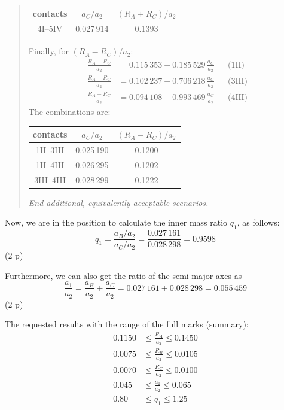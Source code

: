 \begin{description}
\begin{description}
\begin{quote}
\begin{center}
    \begin{tabular}{ccc}
      \hline
      contacts & $a_C/a_2$ & $(R_A + R_C)/a_2$ \\
      \hline
      4I--5IV & 0.027\,914 & 0.1393 \\
      \hline
    \end{tabular}
    \end{center}
    Finally, for $(R_A - R_C)/a_2$:
    \begin{align*}
      \frac{R_A - R_C}{a_2}
        &= 0.115\,353 + 0.185\,529\,\frac{a_C}{a_2}
        && \text{(1II)} \\
      \frac{R_A - R_C}{a_2}
        &= 0.102\,237 + 0.706\,218\,\frac{a_C}{a_2}
        && \text{(3III)} \\
      \frac{R_A - R_C}{a_2}
        &= 0.094\,108 + 0.993\,469\,\frac{a_C}{a_2}
        && \text{(4III)}
    \end{align*}
    The combinations are:
    \begin{center}
    \begin{tabular}{ccc}
      \hline
      contacts & $a_C/a_2$ & $(R_A - R_C)/a_2$ \\
      \hline
      1II--3III  & 0.025\,190 & 0.1200 \\
      1II--4III  & 0.026\,295 & 0.1202 \\
      3III--4III & 0.028\,299 & 0.1222 \\
      \hline
    \end{tabular}
    \end{center}
    \emph{End additional, equivalently acceptable scenarios.}
    \end{quote}

    Now, we are in the position to calculate the inner mass ratio $q_1$, as
    follows:
    \[ q_1 = \frac{a_B/a_2}{a_C/a_2}
       = \frac{0.027\,161}{0.028\,298} = 0.9598
       \tag*{(2.27)} \]
    \hfill(2 p)

    Furthermore, we can also get the ratio of the semi-major axes as
    \[ \frac{a_1}{a_2} = \frac{a_B}{a_2} + \frac{a_C}{a_2}
       = 0.027\,161 + 0.028\,298 = 0.055\,459
       \tag*{(2.28)} \]
    \hfill(2 p)

    The requested results with the range of the full marks (summary):
    \begin{align*}
      0.1150 &\le \frac{R_A}{a_2} \le 0.1450 \\
      0.0075 &\le \frac{R_B}{a_2} \le 0.0105 \\
      0.0070 &\le \frac{R_C}{a_2} \le 0.0100 \\
      0.045 &\le \frac{a_1}{a_2} \le 0.065 \\
      0.80 &\le q_1 \le 1.25
    \end{align*}


\end{description}
\end{description}

